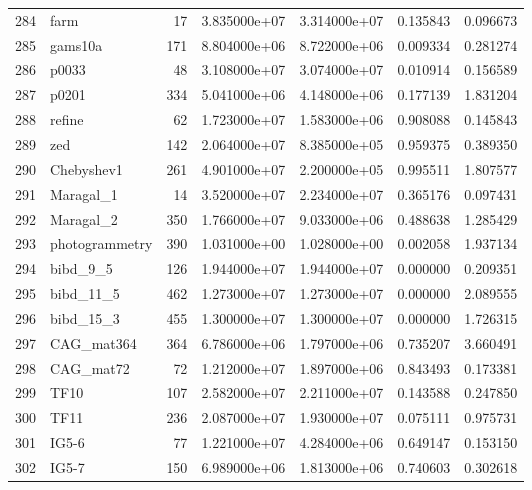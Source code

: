 \begin{tabular}{llrrrrr}
284 &                     farm &    17 &  3.835000e+07 &  3.314000e+07 &  0.135843 &   0.096673 \\
285 &                  gams10a &   171 &  8.804000e+06 &  8.722000e+06 &  0.009334 &   0.281274 \\
286 &                    p0033 &    48 &  3.108000e+07 &  3.074000e+07 &  0.010914 &   0.156589 \\
287 &                    p0201 &   334 &  5.041000e+06 &  4.148000e+06 &  0.177139 &   1.831204 \\
288 &                   refine &    62 &  1.723000e+07 &  1.583000e+06 &  0.908088 &   0.145843 \\
289 &                      zed &   142 &  2.064000e+07 &  8.385000e+05 &  0.959375 &   0.389350 \\
290 &               Chebyshev1 &   261 &  4.901000e+07 &  2.200000e+05 &  0.995511 &   1.807577 \\
291 &                Maragal\_1 &    14 &  3.520000e+07 &  2.234000e+07 &  0.365176 &   0.097431 \\
292 &                Maragal\_2 &   350 &  1.766000e+07 &  9.033000e+06 &  0.488638 &   1.285429 \\
293 &           photogrammetry &   390 &  1.031000e+00 &  1.028000e+00 &  0.002058 &   1.937134 \\
294 &                 bibd\_9\_5 &   126 &  1.944000e+07 &  1.944000e+07 &  0.000000 &   0.209351 \\
295 &                bibd\_11\_5 &   462 &  1.273000e+07 &  1.273000e+07 &  0.000000 &   2.089555 \\
296 &                bibd\_15\_3 &   455 &  1.300000e+07 &  1.300000e+07 &  0.000000 &   1.726315 \\
297 &               CAG\_mat364 &   364 &  6.786000e+06 &  1.797000e+06 &  0.735207 &   3.660491 \\
298 &                CAG\_mat72 &    72 &  1.212000e+07 &  1.897000e+06 &  0.843493 &   0.173381 \\
299 &                     TF10 &   107 &  2.582000e+07 &  2.211000e+07 &  0.143588 &   0.247850 \\
300 &                     TF11 &   236 &  2.087000e+07 &  1.930000e+07 &  0.075111 &   0.975731 \\
301 &                    IG5-6 &    77 &  1.221000e+07 &  4.284000e+06 &  0.649147 &   0.153150 \\
302 &                    IG5-7 &   150 &  6.989000e+06 &  1.813000e+06 &  0.740603 &   0.302618 \\

\end{tabular}
